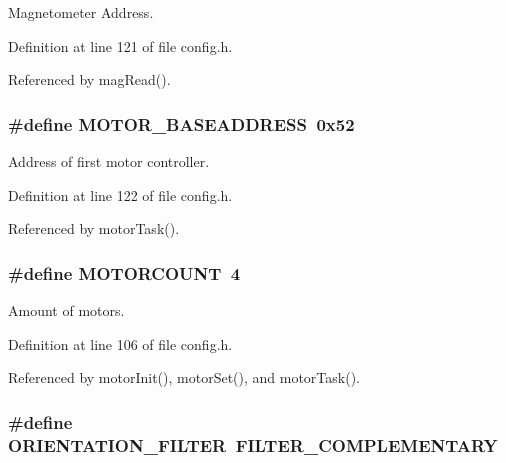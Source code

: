 Magnetometer Address. 



Definition at line 121 of file config.\-h.



Referenced by mag\-Read().

\hypertarget{group__config_ga6e8ab18bbb1ef1b1e929c627f18224a3}{
\subsubsection[{M\-O\-T\-O\-R\-\_\-\-B\-A\-S\-E\-A\-D\-D\-R\-E\-S\-S}]{\setlength{\rightskip}{0pt plus 5cm}\#define M\-O\-T\-O\-R\-\_\-\-B\-A\-S\-E\-A\-D\-D\-R\-E\-S\-S~0x52}}\label{group__config_ga6e8ab18bbb1ef1b1e929c627f18224a3}


Address of first motor controller. 



Definition at line 122 of file config.\-h.



Referenced by motor\-Task().

\hypertarget{group__config_ga1a2c496f8bb7dbb5f1dfef5c32624a6d}{
\subsubsection[{M\-O\-T\-O\-R\-C\-O\-U\-N\-T}]{\setlength{\rightskip}{0pt plus 5cm}\#define M\-O\-T\-O\-R\-C\-O\-U\-N\-T~4}}\label{group__config_ga1a2c496f8bb7dbb5f1dfef5c32624a6d}


Amount of motors. 



Definition at line 106 of file config.\-h.



Referenced by motor\-Init(), motor\-Set(), and motor\-Task().

\hypertarget{group__config_gaf45c761b3bd949068c77712e21259564}{
\subsubsection[{O\-R\-I\-E\-N\-T\-A\-T\-I\-O\-N\-\_\-\-F\-I\-L\-T\-E\-R}]{\setlength{\rightskip}{0pt plus 5cm}\#define O\-R\-I\-E\-N\-T\-A\-T\-I\-O\-N\-\_\-\-F\-I\-L\-T\-E\-R~F\-I\-L\-T\-E\-R\-\_\-\-C\-O\-M\-P\-L\-E\-M\-E\-N\-T\-A\-R\-Y}}\label{group__config_gaf45c761b3bd949068c77712e21259564}


